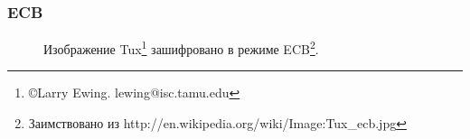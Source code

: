 \begin{frame}
    \frametitle{ECB}
    
    \begin{figure}
        \begin{center}
        \end{center}
        \caption{Изображение Tux\footnote{\copyright Larry Ewing. lewing@isc.tamu.edu} зашифровано в режиме ECB\footnote{Заимствовано из http://en.wikipedia.org/wiki/Image:Tux\_ecb.jpg}.}\label{pict:tuxEcb}
    \end{figure} 
\end{frame}



